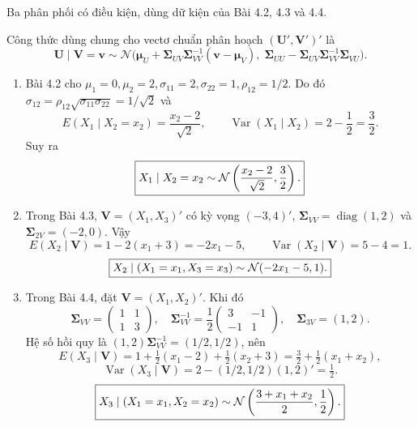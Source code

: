 \begin{problem}[Bài 4.5.]
Ba phân phối có điều kiện, dùng dữ kiện của Bài 4.2, 4.3 và 4.4.
\end{problem}
\begin{solution}
Công thức dùng chung cho vectơ chuẩn phân hoạch $(\mathbf U',\mathbf V')'$ là
\[
\mathbf U\mid\mathbf V=\mathbf v\sim\mathcal N\bigl(
\boldsymbol\mu_U+\boldsymbol\Sigma_{UV}\boldsymbol\Sigma_{VV}^{-1}
(\mathbf v-\boldsymbol\mu_V),\;
\boldsymbol\Sigma_{UU}-\boldsymbol\Sigma_{UV}\boldsymbol\Sigma_{VV}^{-1}
\boldsymbol\Sigma_{VU}\bigr).
\]
\begin{enumerate}[label=\textbf{\alph*)}]
\item Bài 4.2 cho $\mu_1=0,\mu_2=2,\sigma_{11}=2,\sigma_{22}=1,\rho_{12}=1/2$.
Do đó $\sigma_{12}=\rho_{12}\sqrt{\sigma_{11}\sigma_{22}}=1/\sqrt2$ và
\[
E(X_1\mid X_2=x_2)=\frac{x_2-2}{\sqrt2},\qquad
\operatorname{Var}(X_1\mid X_2)=2-\frac12=\frac32.
\]
Suy ra
\[
\boxed{X_1\mid X_2=x_2\sim\mathcal N\left(\frac{x_2-2}{\sqrt2},\frac32\right).}
\]
\item Trong Bài 4.3, $\mathbf V=(X_1,X_3)'$ có kỳ vọng $(-3,4)'$,
$\boldsymbol\Sigma_{VV}=\operatorname{diag}(1,2)$ và
$\boldsymbol\Sigma_{2V}=(-2,0)$. Vậy
\[
E(X_2\mid\mathbf V)=1-2(x_1+3)=-2x_1-5,\qquad
\operatorname{Var}(X_2\mid\mathbf V)=5-4=1.
\]
\[
\boxed{X_2\mid(X_1=x_1,X_3=x_3)\sim\mathcal N(-2x_1-5,1).}
\]
\item Trong Bài 4.4, đặt $\mathbf V=(X_1,X_2)'$. Khi đó
\[
\boldsymbol\Sigma_{VV}=\begin{pmatrix}1&1\\1&3\end{pmatrix},\quad
\boldsymbol\Sigma_{VV}^{-1}=\frac12\begin{pmatrix}3&-1\\-1&1\end{pmatrix},\quad
\boldsymbol\Sigma_{3V}=(1,2).
\]
Hệ số hồi quy là $(1,2)\boldsymbol\Sigma_{VV}^{-1}=(1/2,1/2)$, nên
\[
E(X_3\mid\mathbf V)=1+\tfrac12(x_1-2)+\tfrac12(x_2+3)
=\tfrac32+\tfrac12(x_1+x_2),
\]
\[
\operatorname{Var}(X_3\mid\mathbf V)=2-(1/2,1/2)(1,2)'=\tfrac12.
\]
\[
\boxed{X_3\mid(X_1=x_1,X_2=x_2)\sim
\mathcal N\left(\frac{3+x_1+x_2}{2},\frac12\right).}
\]
\end{enumerate}
\end{solution}

